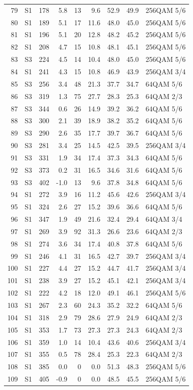 \begin{longtable}{rlrrrrrrl}
79 & S1 & 178 & 5.8 & 13 & 9.6 & 52.9 & 49.9 & 256QAM 5/6\\
80 & S1 & 189 & 5.1 & 17 & 11.6 & 48.0 & 45.0 & 256QAM 5/6\\
81 & S1 & 196 & 5.1 & 20 & 12.8 & 48.2 & 45.2 & 256QAM 5/6\\
82 & S1 & 208 & 4.7 & 15 & 10.8 & 48.1 & 45.1 & 256QAM 5/6\\
83 & S3 & 224 & 4.5 & 14 & 10.4 & 48.0 & 45.0 & 256QAM 5/6\\
84 & S1 & 241 & 4.3 & 15 & 10.8 & 46.9 & 43.9 & 256QAM 3/4\\
85 & S3 & 256 & 3.4 & 48 & 21.3 & 37.7 & 34.7 & 64QAM 5/6\\
86 & S3 & 319 & 1.3 & 75 & 27.7 & 28.3 & 25.3 & 64QAM 2/3\\
87 & S3 & 344 & 0.6 & 26 & 14.9 & 39.2 & 36.2 & 64QAM 5/6\\
88 & S3 & 300 & 2.1 & 39 & 18.9 & 38.2 & 35.2 & 64QAM 5/6\\
89 & S3 & 290 & 2.6 & 35 & 17.7 & 39.7 & 36.7 & 64QAM 5/6\\
90 & S3 & 281 & 3.4 & 25 & 14.5 & 42.5 & 39.5 & 256QAM 3/4\\
91 & S3 & 331 & 1.9 & 34 & 17.4 & 37.3 & 34.3 & 64QAM 5/6\\
92 & S3 & 373 & 0.2 & 31 & 16.5 & 34.6 & 31.6 & 64QAM 5/6\\
93 & S3 & 402 & -1.0 & 13 & 9.6 & 37.8 & 34.8 & 64QAM 5/6\\
94 & S1 & 272 & 3.9 & 16 & 11.2 & 45.6 & 42.6 & 256QAM 3/4\\
95 & S1 & 324 & 2.6 & 27 & 15.2 & 39.6 & 36.6 & 64QAM 5/6\\
96 & S1 & 347 & 1.9 & 49 & 21.6 & 32.4 & 29.4 & 64QAM 3/4\\
97 & S1 & 269 & 3.9 & 92 & 31.3 & 26.6 & 23.6 & 64QAM 2/3\\
98 & S1 & 274 & 3.6 & 34 & 17.4 & 40.8 & 37.8 & 64QAM 5/6\\
99 & S1 & 246 & 4.1 & 31 & 16.5 & 42.7 & 39.7 & 256QAM 3/4\\
100 & S1 & 227 & 4.4 & 27 & 15.2 & 44.7 & 41.7 & 256QAM 3/4\\
101 & S1 & 238 & 3.9 & 27 & 15.2 & 45.1 & 42.1 & 256QAM 3/4\\
102 & S1 & 222 & 4.2 & 18 & 12.0 & 49.1 & 46.1 & 256QAM 5/6\\
103 & S1 & 267 & 2.3 & 60 & 24.3 & 35.2 & 32.2 & 64QAM 5/6\\
104 & S1 & 318 & 2.9 & 79 & 28.6 & 27.9 & 24.9 & 64QAM 2/3\\
105 & S1 & 353 & 1.7 & 73 & 27.3 & 27.3 & 24.3 & 64QAM 2/3\\
106 & S1 & 359 & 1.0 & 14 & 10.4 & 43.6 & 40.6 & 256QAM 3/4\\
107 & S1 & 355 & 0.5 & 78 & 28.4 & 25.3 & 22.3 & 64QAM 2/3\\
108 & S1 & 385 & 0.0 & 0 & 0.0 & 51.3 & 48.3 & 256QAM 5/6\\
109 & S1 & 405 & -0.9 & 0 & 0.0 & 48.5 & 45.5 & 256QAM 5/6\\
\bottomrule\end{longtable}
